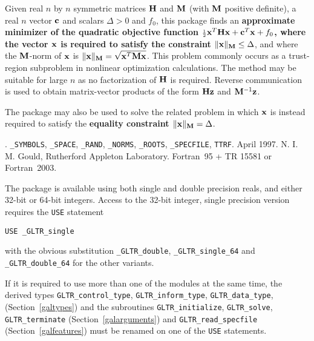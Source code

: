 \documentclass{galahad}
\newcommand{\packagename}{GL\-TR}
\newcommand{\fullpackagename}{\libraryname\_\packagename}
\begin{document}
\galheader


\galsummary
Given real $n$ by $n$ symmetric matrices ${\mathbf{H}}$ and ${\mathbf{M}}$
(with ${\mathbf{M}}$ positive definite), a real
$n$ vector ${\mathbf{c}}$ and scalars $\Delta>0$ and $f_0$, this package finds an
{\bf approximate minimizer of the quadratic objective function
${\scriptstyle \frac{1}{2}} {\mathbf{x}}^T {\mathbf{H}} {\mathbf{x}}  +  {\mathbf{c}}^T {\mathbf{x}} + f_0$, where the vector ${\mathbf{x}}$ is
required to satisfy the constraint $\|{\mathbf{x}}\|_{{\mathbf{M}}} \leq  \Delta$}, and
where the ${\mathbf{M}}$-norm of ${\mathbf{x}}$ is $\|{\mathbf{x}}\|_{{\mathbf{M}}} = \sqrt{{\mathbf{x}}^T {\mathbf{M}} {\mathbf{x}}}$.
This problem commonly occurs as a trust-region subproblem in nonlinear
optimization calculations.
The method may be suitable for large $n$ as no factorization of ${\mathbf{H}}$ is
required. Reverse communication is used to obtain
matrix-vector products of the form ${\mathbf{H}} {\mathbf{z}}$ and ${\mathbf{M}}^{-1} {\mathbf{z}}$.

\noindent
The package may also be used to solve the related problem in which ${\mathbf{x}}$ is
instead required to satisfy the
{\bf equality constraint $\|{\mathbf{x}}\|_{{\mathbf{M}}} = \Delta$}.


\galattributes
\galversions{\tt  \fullpackagename\_single, \fullpackagename\_double}.
\galuses
{\tt \libraryname\_SY\-M\-BOLS},
{\tt \libraryname\_SPACE}, {\tt \libraryname\_\-RAND},
{\tt \libraryname\_\-NORMS},
{\tt \libraryname\_ROOTS}, {\tt \libraryname\_SPECFILE},
{\tt *TTRF}.
\galdate April 1997.
\galorigin N. I. M. Gould, Rutherford Appleton Laboratory.
\gallanguage Fortran~95 + TR 15581 or Fortran~2003.


\galhowto

The package is available using both single and double precision reals, 
and either 32-bit or 64-bit integers. Access to the 32-bit integer,
single precision version requires the {\tt USE} statement
\medskip

\hspace{8mm} {\tt USE \fullpackagename\_single}

\medskip
\noindent
with the obvious substitution {\tt \fullpackagename\_double},
{\tt \fullpackagename\_single\_64} and 
{\tt \fullpackagename\_double\_64} for the other variants.

\noindent
If it is required to use more than one of the modules at the same time, 
the derived types
{\tt \packagename\_control\_type}, {\tt \packagename\_inform\_type},
{\tt \packagename\_data\_type},
(Section~\ref{galtypes})
and the subroutines
{\tt \packagename\_initialize},
{\tt \packagename\_solve}, {\tt \packagename\_terminate}
(Section~\ref{galarguments})
and
{\tt \packagename\_read\_specfile}
(Section~\ref{galfeatures})
must be renamed on one of the {\tt USE} statements.
\end{document}
